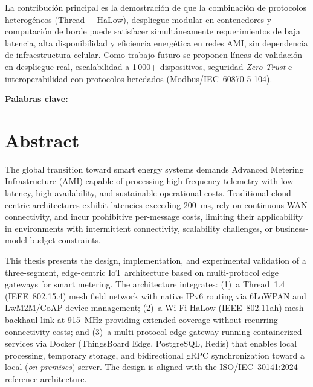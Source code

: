 \par La contribución principal es la demostración de que la combinación de protocolos heterogéneos (Thread + HaLow), despliegue modular en contenedores y computación de borde puede satisfacer simultáneamente requerimientos de baja latencia, alta disponibilidad y eficiencia energética en redes AMI, sin dependencia de infraestructura celular. Como trabajo futuro se proponen líneas de validación en despliegue real, escalabilidad a 1\,000+ dispositivos, seguridad \emph{Zero Trust} e interoperabilidad con protocolos heredados (Modbus/IEC~60870-5-104).

\vfill
\noindent\textbf{Palabras clave:} \palabrasclave

\newpage
\thispagestyle{empty}
\chapter*{\sffamily Abstract}
%
\begin{center}
\textbf{\large \thesisnameeng}
\end{center}

\par The global transition toward smart energy systems demands Advanced Metering Infrastructure (AMI) capable of processing high-frequency telemetry with low latency, high availability, and sustainable operational costs. Traditional cloud-centric architectures exhibit latencies exceeding 200~ms, rely on continuous WAN connectivity, and incur prohibitive per-message costs, limiting their applicability in environments with intermittent connectivity, scalability challenges, or business-model budget constraints.

\par This thesis presents the design, implementation, and experimental validation of a three-segment, edge-centric IoT architecture based on multi-protocol edge gateways for smart metering. The architecture integrates: (1)~a Thread~1.4 (IEEE~802.15.4) mesh field network with native IPv6 routing via 6LoWPAN and LwM2M/CoAP device management; (2)~a Wi-Fi HaLow (IEEE~802.11ah) mesh backhaul link at 915~MHz providing extended coverage without recurring connectivity costs; and (3)~a multi-protocol edge gateway running containerized services via Docker (ThingsBoard Edge, PostgreSQL, Redis) that enables local processing, temporary storage, and bidirectional gRPC synchronization toward a local (\textit{on-premises}) server. The design is aligned with the ISO/IEC~30141:2024 reference architecture.

